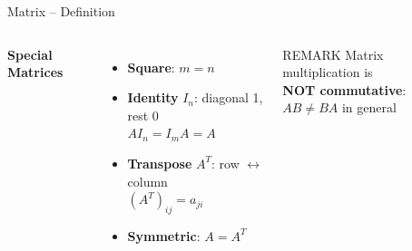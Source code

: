 \documentclass{beamer}
\begin{document}
\begin{frame}[t,shrink=3]{Matrix -- Definition}
\begin{columns}[T]
        \textbf{Special Matrices}
        \vspace{0.05cm}

        \footnotesize
        \begin{itemize}\setlength\itemsep{0.2em}
            \item \textbf{Square}: $m = n$
            \item \textbf{Identity} $I_n$: diagonal 1, rest 0\\
                  $AI_n = I_m A = A$
            \item \textbf{Transpose} $A^T$: row $\leftrightarrow$ column\\
                  $(A^T)_{ij} = a_{ji}$
            \item \textbf{Symmetric}: $A = A^T$
        \end{itemize}

        \vspace{0.1cm}
        \begin{alertblock}{REMARK}
            \scriptsize Matrix multiplication is\\
            \textbf{NOT commutative}: $AB \neq BA$ in general
        \end{alertblock}
    \end{columns}
\end{frame}
\end{document}
